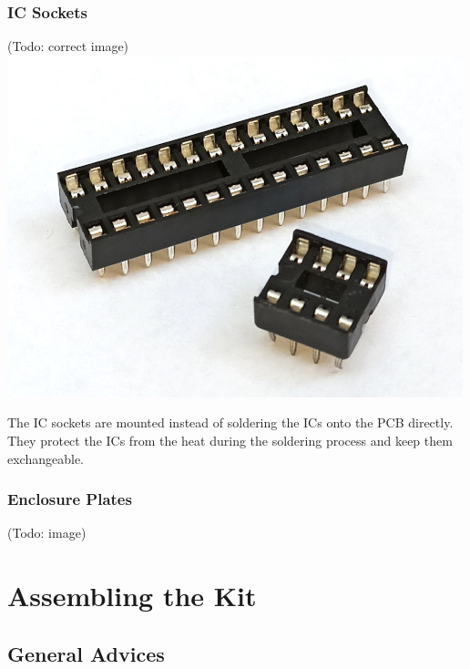 \documentclass{scrartcl}
\begin{document}
\subsubsection{IC Sockets}

\begin{center}
    (Todo: correct image)
    \includegraphics[scale=0.5]{assets/zekit-sockets-resized.jpg}
\end{center}

The IC sockets are mounted instead of soldering the ICs onto the PCB directly. They protect the ICs from the heat during the soldering process and keep them exchangeable.

\subsubsection{Enclosure Plates}

\begin{center}
    (Todo: image)
\end{center}

\pagebreak


\section{Assembling the Kit}

\subsection{General Advices}
\end{document}
